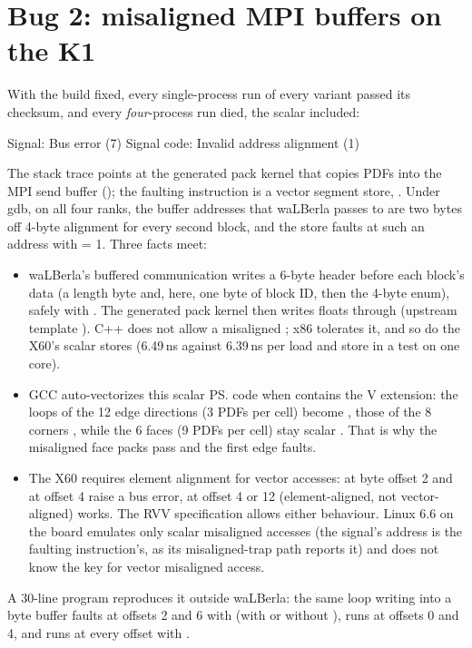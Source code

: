 \section{Bug 2: misaligned MPI buffers on the K1}\label{r04:sec:misaligned}

With the build fixed, every single-process run of every variant passed its checksum,
and every \emph{four}-process run died, the scalar  included:
\begin{plaincode}
Signal: Bus error (7)
Signal code: Invalid address alignment (1)
\end{plaincode}
The stack trace points at the generated pack kernel that copies PDFs into the MPI send
buffer (); the
faulting instruction is a vector segment store, . Under gdb, on all
four ranks, the buffer addresses that waLBerla passes to  are two
bytes off 4-byte alignment for every second block, and the store faults at such an
address with  = 1. Three facts meet:
\begin{itemize}
  \item waLBerla's buffered communication writes a 6-byte header before each block's
    data (a length byte and, here, one byte of block ID, then the 4-byte
     enum), safely with . The generated pack kernel then
    writes floats through  (upstream template
    ). C++ does not allow a misaligned
    ; x86 tolerates it, and so do the X60's scalar stores (6.49\,ns against
    6.39\,ns per load and store in a test on one core).
  \item GCC auto-vectorizes this scalar \ps{} code when  contains the V
    extension: the loops of the 12 edge directions (3 PDFs per cell) become
    , those of the 8 corners , while the 6 faces (9 PDFs
    per cell) stay scalar . That is why the misaligned face packs pass and the
    first edge faults.
  \item The X60 requires element alignment for vector accesses:  at byte
    offset 2 and  at offset 4 raise a bus error,  at offset 4 or
    12 (element-aligned, not vector-aligned) works. The RVV specification allows either
    behaviour. Linux 6.6 on the board emulates only scalar misaligned accesses (the
    signal's address is the faulting instruction's, as its misaligned-trap path reports
    it) and does not know the  key for vector misaligned access.
\end{itemize}
A 30-line program reproduces it outside waLBerla: the same loop writing into a byte
buffer faults at offsets 2 and 6 with  (with or without
), runs at offsets 0 and 4, and runs at every offset with
.

